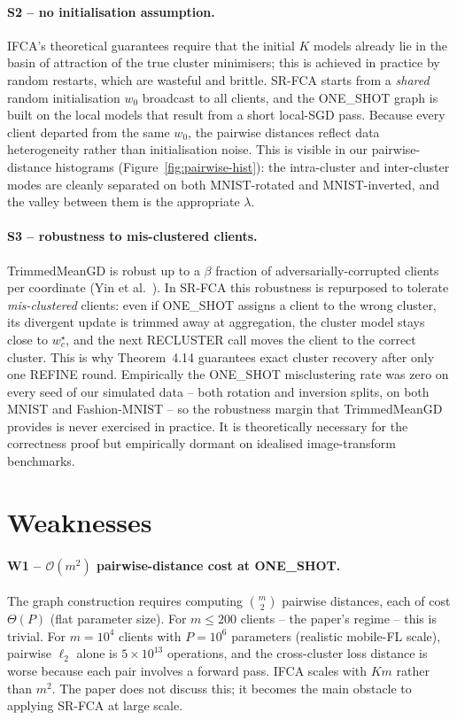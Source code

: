 \paragraph{S2 -- no initialisation assumption.} IFCA's theoretical guarantees require that the initial $K$ models already lie in the basin of attraction of the true cluster minimisers; this is achieved in practice by random restarts, which are wasteful and brittle. SR-FCA starts from a \emph{shared} random initialisation $w_0$ broadcast to all clients, and the ONE\_SHOT graph is built on the local models that result from a short local-SGD pass. Because every client departed from the same $w_0$, the pairwise distances reflect data heterogeneity rather than initialisation noise. This is visible in our pairwise-distance histograms (Figure~\ref{fig:pairwise-hist}): the intra-cluster and inter-cluster modes are cleanly separated on both MNIST-rotated and MNIST-inverted, and the valley between them is the appropriate $\lambda$.

\paragraph{S3 -- robustness to mis-clustered clients.} TrimmedMeanGD is robust up to a $\beta$ fraction of adversarially-corrupted clients per coordinate (Yin et al.~\parencite{yin2018trimmedmean}). In SR-FCA this robustness is repurposed to tolerate \emph{mis-clustered} clients: even if ONE\_SHOT assigns a client to the wrong cluster, its divergent update is trimmed away at aggregation, the cluster model stays close to $w_c^\star$, and the next RECLUSTER call moves the client to the correct cluster. This is why Theorem~4.14 guarantees exact cluster recovery after only one REFINE round. Empirically the ONE\_SHOT misclustering rate was zero on every seed of our simulated data -- both rotation and inversion splits, on both MNIST and Fashion-MNIST -- so the robustness margin that TrimmedMeanGD provides is never exercised in practice. It is theoretically necessary for the correctness proof but empirically dormant on idealised image-transform benchmarks.

\section{Weaknesses}\label{sec:weaknesses}

\paragraph{W1 -- $\mathcal{O}(m^2)$ pairwise-distance cost at ONE\_SHOT.} The graph construction requires computing $\binom{m}{2}$ pairwise distances, each of cost $\Theta(P)$ (flat parameter size). For $m \le 200$ clients -- the paper's regime -- this is trivial. For $m = 10^4$ clients with $P = 10^6$ parameters (realistic mobile-FL scale), pairwise $\ell_2$ alone is $5 \times 10^{13}$ operations, and the cross-cluster loss distance is worse because each pair involves a forward pass. IFCA scales with $K m$ rather than $m^2$. The paper does not discuss this; it becomes the main obstacle to applying SR-FCA at large scale.

